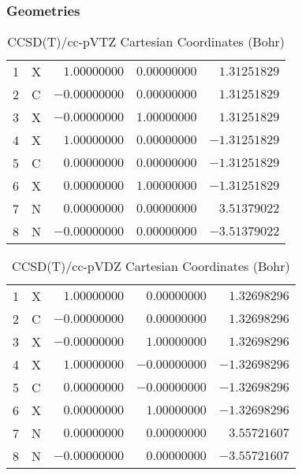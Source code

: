 \documentclass[10pt,oneside]{article}
\begin{document}
\subsubsection*{Geometries}
\begin{table}[h!]
\centering
\caption{CCSD(T)/cc-pVTZ Cartesian Coordinates (Bohr)}
\begin{tabular}{llrrr}
1  & X  & $ 1.00000000$ & $ 0.00000000$ & $ 1.31251829$ \\
2  & C  & $-0.00000000$ & $ 0.00000000$ & $ 1.31251829$ \\
3  & X  & $-0.00000000$ & $ 1.00000000$ & $ 1.31251829$ \\
4  & X  & $ 1.00000000$ & $ 0.00000000$ & $-1.31251829$ \\
5  & C  & $ 0.00000000$ & $ 0.00000000$ & $-1.31251829$ \\
6  & X  & $ 0.00000000$ & $ 1.00000000$ & $-1.31251829$ \\
7  & N  & $ 0.00000000$ & $ 0.00000000$ & $ 3.51379022$ \\
8  & N  & $-0.00000000$ & $ 0.00000000$ & $-3.51379022$ \\
\end{tabular}
\end{table}

\begin{table}[h!]
\centering
\caption{CCSD(T)/cc-pVDZ Cartesian Coordinates (Bohr)}
\begin{tabular}{llrrr}
1  & X  & $ 1.00000000$ & $ 0.00000000$ & $ 1.32698296$ \\
2  & C  & $-0.00000000$ & $ 0.00000000$ & $ 1.32698296$ \\
3  & X  & $-0.00000000$ & $ 1.00000000$ & $ 1.32698296$ \\
4  & X  & $ 1.00000000$ & $-0.00000000$ & $-1.32698296$ \\
5  & C  & $ 0.00000000$ & $-0.00000000$ & $-1.32698296$ \\
6  & X  & $ 0.00000000$ & $ 1.00000000$ & $-1.32698296$ \\
7  & N  & $ 0.00000000$ & $ 0.00000000$ & $ 3.55721607$ \\
8  & N  & $-0.00000000$ & $ 0.00000000$ & $-3.55721607$ \\
\end{tabular}
\end{table}
\end{document}
